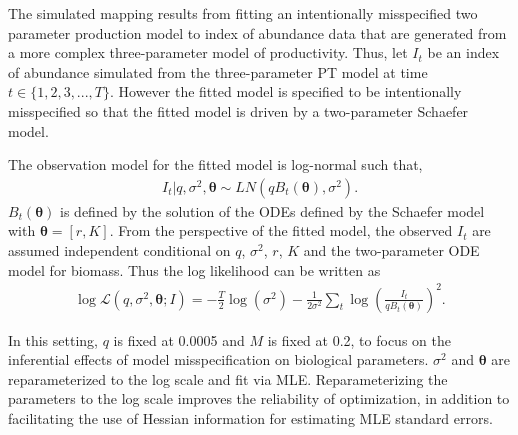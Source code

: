 %
The simulated mapping results from fitting an intentionally misspecified two
parameter production model to index of abundance data that are generated from
a more complex three-parameter model of productivity.
Thus, let $I_t$ be an index of abundance simulated from the three-parameter PT model
at time $t\in\{1,2, 3,..., T\}$. However the
fitted model is specified to be intentionally misspecified so that the fitted
model is driven by a two-parameter Schaefer model. %

%
The observation model for the fitted model is log-normal such that,
%
\begin{align}
I_t| q, \sigma^2, \bm{\theta} \sim LN(qB_t(\bm{\theta}), \sigma^2).
\end{align}
%
$B_t(\bm{\theta})$ is defined by the solution of the ODEs defined by the Schaefer model with $\bm{\theta}=[r, K]$. %
%
%
From the perspective of the fitted model, the observed $I_t$ are assumed independent
conditional on $q$, $\sigma^2$, $r$, $K$ and the two-parameter ODE model for biomass.
Thus the log likelihood can be written as
%
\begin{align}
\log\mathcal{L}(q, \sigma^2, \bm{\theta}; I) = - \frac{T}{2}\log(\sigma^2) - \frac{1}{2\sigma^2}\sum_t \log\left(\frac{I_t}{qB_t(\bm{\theta})}\right)^2. \label{logLike}
\end{align}

%
In this setting, $q$ is fixed at 0.0005 and $M$ is fixed at 0.2, to focus on
the inferential effects of model misspecification on biological parameters.
$\sigma^2$ and $\bm{\theta}$ are reparameterized to the log scale
and fit via MLE.
Reparameterizing the parameters to the log scale improves the reliability
of optimization, in addition to facilitating the use of Hessian information
for estimating MLE standard errors.

